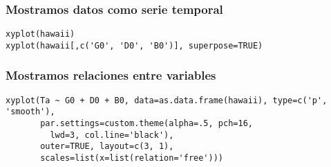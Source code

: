 \documentclass[bigger]{beamer}
\begin{document}
\begin{frame}[fragile]
\frametitle{Mostramos datos como serie temporal}
\label{sec-3-1-3}


\lstset{language=R}
\begin{lstlisting}
xyplot(hawaii)
xyplot(hawaii[,c('G0', 'D0', 'B0')], superpose=TRUE)
\end{lstlisting}
\end{frame}
\begin{frame}[fragile]
\frametitle{Mostramos relaciones entre variables}
\label{sec-3-1-4}


\lstset{language=R}
\begin{lstlisting}
xyplot(Ta ~ G0 + D0 + B0, data=as.data.frame(hawaii), type=c('p', 'smooth'),
       par.settings=custom.theme(alpha=.5, pch=16,
         lwd=3, col.line='black'),
       outer=TRUE, layout=c(3, 1),
       scales=list(x=list(relation='free')))
\end{lstlisting}
\end{frame}
\end{document}
